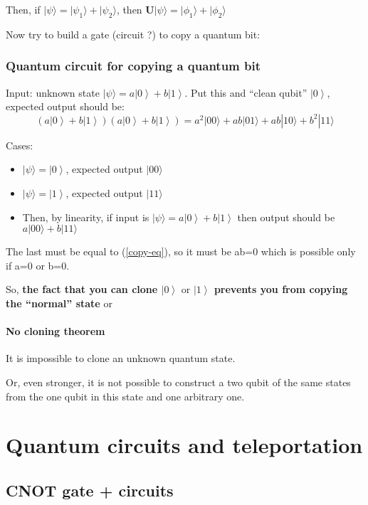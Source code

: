 \documentclass{scrartcl}
\newcommand{\ket}[1]{\left| #1 \right>} %
\begin{document}
Then, if $|\psi \rangle = |\psi_1 \rangle + | \psi_2 \rangle$, then
$\mathbf{U}|\psi \rangle = |\phi_1 \rangle + |\phi_2 \rangle$

Now try to build a gate (circuit ?) to copy a quantum bit:
\subsubsection{Quantum circuit for copying a quantum bit}
\label{sec:5-5-2}

Input: unknown state $|\psi\rangle = a \ket0 + b \ket1$. Put this and ``clean
qubit'' $\ket0$, expected output should be: \begin{equation}(a \ket0 + b
  \ket1)(a \ket0 + b \ket1) = a^2 |00\rangle + ab |01 \rangle + ab |10 \rangle +
  b^2|11\rangle \label{copy-eq} \end{equation}

Cases:
\begin{itemize}
\item $|\psi \rangle = \ket0$, expected output $|00\rangle$
\item $|\psi \rangle = \ket1$, expected output $|11\rangle$
\item Then, by linearity, if input is $|\psi \rangle = a \ket0 + b \ket1$ then
  output should be $a |00\rangle + b |11\rangle$
\end{itemize}
The last must be equal to (\ref{copy-eq}), so it must be ab=0 which is possible
only if a=0 or b=0.

So, {\bf the fact that you can clone $\ket0 \mbox{ or } \ket1$ prevents you from
  copying the ``normal'' state } or

\paragraph{No cloning theorem} It is impossible to clone an unknown quantum
state.

Or, even stronger, it is not possible to construct a two qubit of the same
states from the one qubit in this state and one arbitrary one.

\section{Quantum circuits and teleportation}
\label{sec:6}

\subsection{CNOT gate + circuits}
\label{sec:6-1,2}
\end{document}

